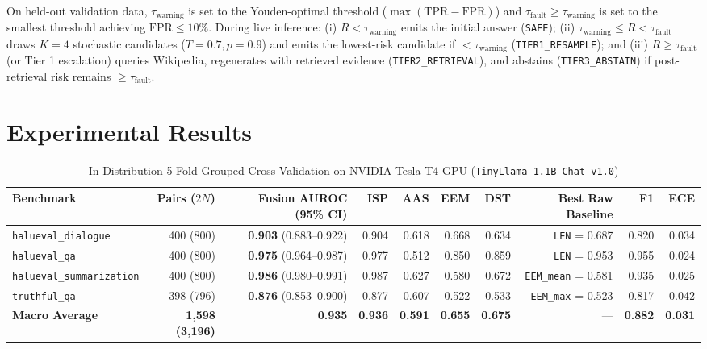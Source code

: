 \documentclass[journal]{IEEEtran}
\begin{document}
On held-out validation data, $\tau_{\text{warning}}$ is set to the Youden-optimal threshold ($\max(\text{TPR}-\text{FPR})$) and $\tau_{\text{fault}} \ge \tau_{\text{warning}}$ is set to the smallest threshold achieving $\text{FPR} \le 10\%$. During live inference: (i) $R < \tau_{\text{warning}}$ emits the initial answer (\texttt{SAFE}); (ii) $\tau_{\text{warning}} \le R < \tau_{\text{fault}}$ draws $K=4$ stochastic candidates ($T=0.7, p=0.9$) and emits the lowest-risk candidate if $< \tau_{\text{warning}}$ (\texttt{TIER1\_RESAMPLE}); and (iii) $R \ge \tau_{\text{fault}}$ (or Tier 1 escalation) queries Wikipedia, regenerates with retrieved evidence (\texttt{TIER2\_RETRIEVAL}), and abstains (\texttt{TIER3\_ABSTAIN}) if post-retrieval risk remains $\ge \tau_{\text{fault}}$.

\section{Experimental Results}
\begin{table}[t]
\centering
\caption{In-Distribution 5-Fold Grouped Cross-Validation on NVIDIA Tesla T4 GPU (\texttt{TinyLlama-1.1B-Chat-v1.0})}
\begin{tabular}{lrrrrrrrrr}
\toprule
Benchmark & Pairs ($2N$) & Fusion AUROC (95\% CI) & ISP & AAS & EEM & DST & Best Raw Baseline & F1 & ECE \\
\midrule
\texttt{halueval\_dialogue} & 400 (800) & \textbf{0.903} (0.883--0.922) & 0.904 & 0.618 & 0.668 & 0.634 & \texttt{LEN} = 0.687 & 0.820 & 0.034 \\
\texttt{halueval\_qa} & 400 (800) & \textbf{0.975} (0.964--0.987) & 0.977 & 0.512 & 0.850 & 0.859 & \texttt{LEN} = 0.953 & 0.955 & 0.024 \\
\texttt{halueval\_summarization} & 400 (800) & \textbf{0.986} (0.980--0.991) & 0.987 & 0.627 & 0.580 & 0.672 & \texttt{EEM\_mean} = 0.581 & 0.935 & 0.025 \\
\texttt{truthful\_qa} & 398 (796) & \textbf{0.876} (0.853--0.900) & 0.877 & 0.607 & 0.522 & 0.533 & \texttt{EEM\_max} = 0.523 & 0.817 & 0.042 \\
\midrule
\textbf{Macro Average} & \textbf{1,598 (3,196)} & \textbf{0.935} & \textbf{0.936} & \textbf{0.591} & \textbf{0.655} & \textbf{0.675} & --- & \textbf{0.882} & \textbf{0.031} \\
\bottomrule
\end{tabular}
\end{table}
\end{document}
